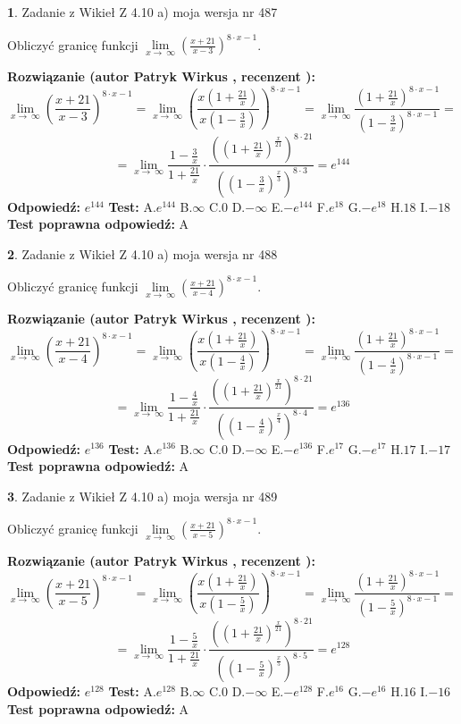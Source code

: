 \documentclass[12pt, a4paper]{article}
\theoremstyle{definition} %
\newtheorem{zad}{}
\newcommand{\zadStart}[1]{\begin{zad}#1\newline}
\newcommand{\zadStop}{\end{zad}}
\newcommand{\rozwStart}[2]{\noindent \textbf{Rozwiązanie (autor #1 , recenzent #2): }\newline}
\newcommand{\rozwStop}{\newline}
\newcommand{\odpStart}{\noindent \textbf{Odpowiedź:}\newline}
\newcommand{\odpStop}{\newline}
\newcommand{\testStart}{\noindent \textbf{Test:}\newline}
\newcommand{\testStop}{\newline}
\newcommand{\kluczStart}{\noindent \textbf{Test poprawna odpowiedź:}\newline}
\newcommand{\kluczStop}{\newline}
\begin{document}
\zadStart{Zadanie z Wikieł Z 4.10 a) moja wersja nr 487}

Obliczyć granicę funkcji  $\lim\limits_{x\to\ \infty}(\frac{x+21}{x-3})^{8\cdot x-1}$.
\zadStop
\rozwStart{Patryk Wirkus}{}
$$\lim\limits_{x\to\ \infty}(\frac{x+21}{x-3})^{8\cdot x-1} = \lim\limits_{x\to\ \infty}(\frac{x(1+\frac{21}{x})}{x(1-\frac{3}{x})})^{8\cdot x-1}=\lim\limits_{x\to\ \infty}\frac{(1+\frac{21}{x})^{8\cdot x-1}}{(1-\frac{3}{x})^{8\cdot x-1}}=$$
$$=\lim\limits_{x\to\ \infty}\frac{1-\frac{3}{x}}{1+\frac{21}{x}}\cdot\frac{((1+\frac{21}{x})^{\frac{x}{21}})^{8\cdot21}}{((1-\frac{3}{x})^{\frac{x}{3}})^{8\cdot3}}=e^{144}$$
\rozwStop
\odpStart
$e^{144}$
\odpStop
\testStart
A.$e^{144}$ B.$\infty$ C.$0$ D.$-\infty$ E.$-e^{144}$
F.$e^{18}$ G.$-e^{18}$
H.$18$
I.$-18$
\testStop
\kluczStart
A
\kluczStop



\zadStart{Zadanie z Wikieł Z 4.10 a) moja wersja nr 488}

Obliczyć granicę funkcji  $\lim\limits_{x\to\ \infty}(\frac{x+21}{x-4})^{8\cdot x-1}$.
\zadStop
\rozwStart{Patryk Wirkus}{}
$$\lim\limits_{x\to\ \infty}(\frac{x+21}{x-4})^{8\cdot x-1} = \lim\limits_{x\to\ \infty}(\frac{x(1+\frac{21}{x})}{x(1-\frac{4}{x})})^{8\cdot x-1}=\lim\limits_{x\to\ \infty}\frac{(1+\frac{21}{x})^{8\cdot x-1}}{(1-\frac{4}{x})^{8\cdot x-1}}=$$
$$=\lim\limits_{x\to\ \infty}\frac{1-\frac{4}{x}}{1+\frac{21}{x}}\cdot\frac{((1+\frac{21}{x})^{\frac{x}{21}})^{8\cdot21}}{((1-\frac{4}{x})^{\frac{x}{4}})^{8\cdot4}}=e^{136}$$
\rozwStop
\odpStart
$e^{136}$
\odpStop
\testStart
A.$e^{136}$ B.$\infty$ C.$0$ D.$-\infty$ E.$-e^{136}$
F.$e^{17}$ G.$-e^{17}$
H.$17$
I.$-17$
\testStop
\kluczStart
A
\kluczStop



\zadStart{Zadanie z Wikieł Z 4.10 a) moja wersja nr 489}

Obliczyć granicę funkcji  $\lim\limits_{x\to\ \infty}(\frac{x+21}{x-5})^{8\cdot x-1}$.
\zadStop
\rozwStart{Patryk Wirkus}{}
$$\lim\limits_{x\to\ \infty}(\frac{x+21}{x-5})^{8\cdot x-1} = \lim\limits_{x\to\ \infty}(\frac{x(1+\frac{21}{x})}{x(1-\frac{5}{x})})^{8\cdot x-1}=\lim\limits_{x\to\ \infty}\frac{(1+\frac{21}{x})^{8\cdot x-1}}{(1-\frac{5}{x})^{8\cdot x-1}}=$$
$$=\lim\limits_{x\to\ \infty}\frac{1-\frac{5}{x}}{1+\frac{21}{x}}\cdot\frac{((1+\frac{21}{x})^{\frac{x}{21}})^{8\cdot21}}{((1-\frac{5}{x})^{\frac{x}{5}})^{8\cdot5}}=e^{128}$$
\rozwStop
\odpStart
$e^{128}$
\odpStop
\testStart
A.$e^{128}$ B.$\infty$ C.$0$ D.$-\infty$ E.$-e^{128}$
F.$e^{16}$ G.$-e^{16}$
H.$16$
I.$-16$
\testStop
\kluczStart
A
\kluczStop
\end{document}
